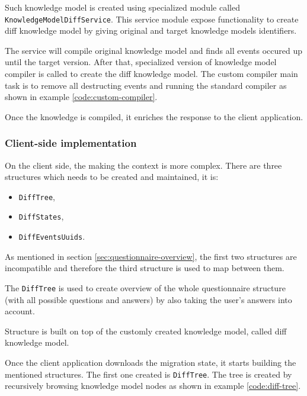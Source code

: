 Such knowledge model is created using specialized module called \texttt{KnowledgeModelDiffService}.
This service module expose functionality to create diff knowledge model by giving original and target knowledge models identifiers.

The service will compile original knowledge model and finds all events occured up until the target version.
After that, specialized version of knowledge model compiler is called to create the diff knowledge model.
The custom compiler main task is to remove all destructing events and running the standard compiler as shown in example \ref{code:custom-compiler}.

Once the knowledge is compiled, it enriches the response to the client application.


\subsubsection*{Client-side implementation}

On the client side, the making the context is more complex.
There are three structures which needs to be created and maintained, it is:

\begin{itemize}
    \item \texttt{DiffTree},
    \item \texttt{DiffStates},
    \item \texttt{DiffEventsUuids}.
\end{itemize}

As mentioned in section \ref{sec:questionnaire-overview}, the first two structures are incompatible and therefore the third structure is used to map between them.

The \texttt{DiffTree} is used to create overview of the whole questionnaire structure (with all possible questions and answers) by also taking the user's answers into account.

Structure is built on top of the customly created knowledge model, called diff knowledge model.

Once the client application downloads the migration state, it starts building the mentioned structures.
The first one created is \texttt{DiffTree}.
The tree is created by recursively browsing knowledge model nodes as shown in example \ref{code:diff-tree}.



